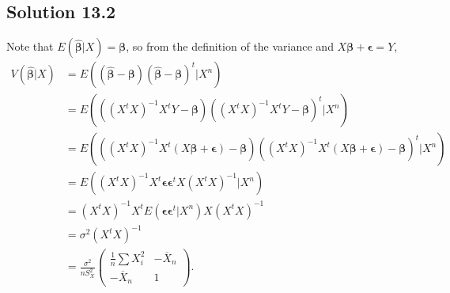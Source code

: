 \subsection*{Solution 13.2}

Note that $E(\hat{\bm{\beta}}|X) = \bm{\beta}$, so from the definition of the variance and $X\bm{\beta} + \bm{\epsilon} = Y$,
\begin{equation*}
    \begin{split}
        V(\hat{\bm{\beta}}|X)
            &= E((\hat{\bm{\beta}} - \bm{\beta})(\hat{\bm{\beta}} - \bm{\beta})^t|X^n) \\
            &= E(((X^tX)^{-1}X^tY - \bm{\beta})((X^tX)^{-1}X^tY - \bm{\beta})^t|X^n) \\
            &= E(((X^tX)^{-1}X^t(X\bm{\beta} + \bm{\epsilon}) - \bm{\beta})((X^tX)^{-1}X^t(X\bm{\beta} + \bm{\epsilon}) - \bm{\beta})^t|X^n) \\
            &= E((X^tX)^{-1}X^t \bm{\epsilon}\bm{\epsilon}^t X(X^tX)^{-1}|X^n) \\
            &= (X^tX)^{-1}X^t E(\bm{\epsilon}\bm{\epsilon}^t|X^n) X(X^tX)^{-1} \\
            &= \sigma^2 (X^tX)^{-1} \\
            &= \frac{\sigma^2}{n S_X^2} \begin{pmatrix}
                \frac{1}{n}\sum X_i^2 & -\overline{X}_n \\
                -\overline{X}_n & 1
            \end{pmatrix}.
    \end{split}
\end{equation*}
